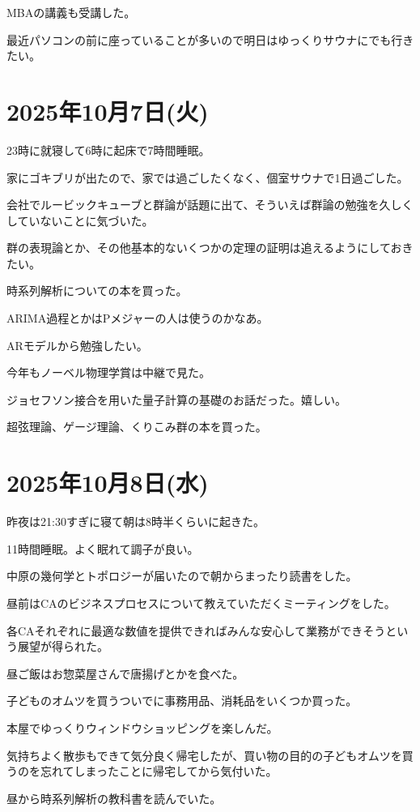 \documentclass[uplatex]{jsarticle}
\begin{document}
MBAの講義も受講した。

最近パソコンの前に座っていることが多いので明日はゆっくりサウナにでも行きたい。


\section{2025年10月7日(火)}

23時に就寝して6時に起床で7時間睡眠。

家にゴキブリが出たので、家では過ごしたくなく、個室サウナで1日過ごした。

会社でルービックキューブと群論が話題に出て、そういえば群論の勉強を久しくしていないことに気づいた。

群の表現論とか、その他基本的ないくつかの定理の証明は追えるようにしておきたい。

時系列解析についての本を買った。

ARIMA過程とかはPメジャーの人は使うのかなあ。

ARモデルから勉強したい。

今年もノーベル物理学賞は中継で見た。

ジョセフソン接合を用いた量子計算の基礎のお話だった。嬉しい。

超弦理論、ゲージ理論、くりこみ群の本を買った。


\section{2025年10月8日(水)}

昨夜は21:30すぎに寝て朝は8時半くらいに起きた。

11時間睡眠。よく眠れて調子が良い。

中原の幾何学とトポロジーが届いたので朝からまったり読書をした。

昼前はCAのビジネスプロセスについて教えていただくミーティングをした。

各CAそれぞれに最適な数値を提供できればみんな安心して業務ができそうという展望が得られた。

昼ご飯はお惣菜屋さんで唐揚げとかを食べた。

子どものオムツを買うついでに事務用品、消耗品をいくつか買った。

本屋でゆっくりウィンドウショッピングを楽しんだ。

気持ちよく散歩もできて気分良く帰宅したが、買い物の目的の子どもオムツを買うのを忘れてしまったことに帰宅してから気付いた。

昼から時系列解析の教科書を読んでいた。
\end{document}
